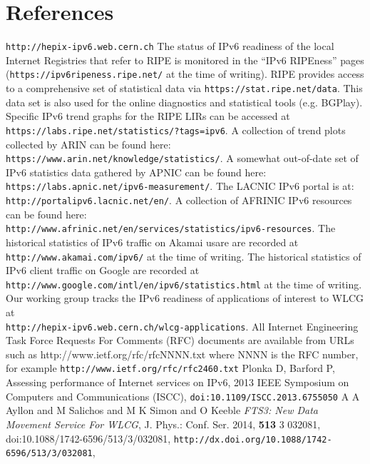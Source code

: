 \section*{References}

\begin{thebibliography}{1}
 {\tt http://hepix-ipv6.web.cern.ch}
 The status of IPv6 readiness of the local Internet Registries
that refer to RIPE is monitored in the ``IPv6 RIPEness'' pages ({\tt https://ipv6ripeness.ripe.net/} at the time of writing). 
 RIPE provides access to a comprehensive set of statistical
data via {\tt https://stat.ripe.net/data}. This data set is also used for
the online diagnostics and statistical tools (e.g. BGPlay). 
 Specific
IPv6 trend graphs for the RIPE LIRs can be accessed at\\ {\tt https://labs.ripe.net/statistics/?tags=ipv6}.
 A collection of trend plots collected by ARIN
can be found here:\\ {\tt https://www.arin.net/knowledge/statistics/}.
 A somewhat out-of-date set of IPv6
statistics data gathered by APNIC can be found here:\\ {\tt https://labs.apnic.net/ipv6-measurement/}.
 The LACNIC IPv6 portal is at:\\ {\tt http://portalipv6.lacnic.net/en/}.
 A collection of AFRINIC IPv6 resources can be found here:\\  {\tt http://www.afrinic.net/en/services/statistics/ipv6-resources}.
 The historical statistics of IPv6 traffic on Akamai usare are recorded at {\tt http://www.akamai.com/ipv6/} at the time of writing.
 The historical statistics of IPv6 client traffic on Google are recorded at\\ {\tt http://www.google.com/intl/en/ipv6/statistics.html} at the time of writing.
 Our working group tracks the IPv6 readiness of applications
of interest to WLCG at\\ {\tt http://hepix-ipv6.web.cern.ch/wlcg-applications}.
 All Internet Engineering Task Force Requests For Comments (RFC) documents are available
from URLs such as http://www.ietf.org/rfc/rfcNNNN.txt where NNNN is the RFC number, for example {\tt http://www.ietf.org/rfc/rfc2460.txt}
 Plonka D, Barford P, Assessing performance of Internet services on IPv6, 2013 IEEE Symposium on Computers and Communications (ISCC), {\tt doi:10.1109/ISCC.2013.6755050}
 {A A Ayllon and M Salichos and M K Simon and O Keeble} {\it {FTS}3: New Data Movement Service For {WLCG}}, {J. Phys.: Conf. Ser.} 2014, {\bf 513} 3 032081,  doi:{10.1088/1742-6596/513/3/032081}, {\tt{http://dx.doi.org/10.1088/1742-6596/513/3/032081}},
\end{thebibliography}
